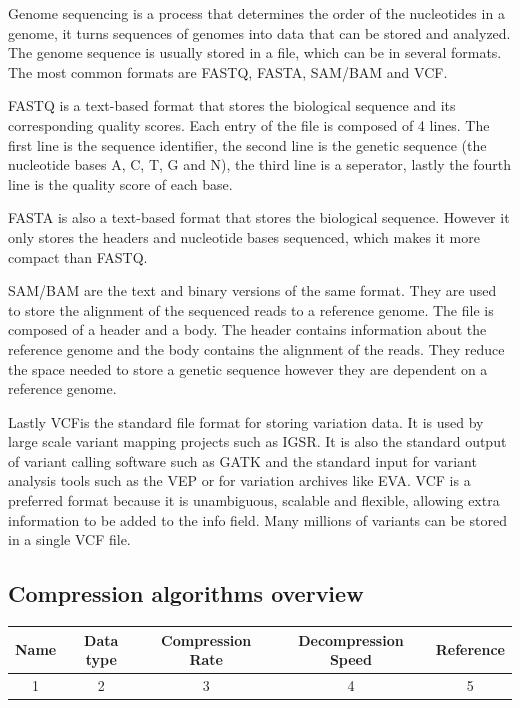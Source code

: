 Genome sequencing is a process that determines the order of the nucleotides in a genome, it turns sequences of genomes into data that can be stored and analyzed. The genome sequence is usually stored in a file, which can be in several formats. The most common formats are FASTQ, FASTA, SAM/BAM and VCF.

FASTQ is a text-based format that stores the biological sequence and its corresponding quality scores. Each entry of the file is composed of 4 lines. The first line is the sequence identifier, the second line is the genetic sequence (the nucleotide bases A, C, T, G and N), the third line is a seperator, lastly the fourth line is the quality score of each base.

FASTA is also a text-based format that stores the biological sequence. However it only stores the headers and nucleotide bases sequenced, which makes it more compact than FASTQ.

SAM/BAM are the text and binary versions of the same format. They are used to store the alignment of the sequenced reads to a reference genome. The file is composed of a header and a body. The header contains information about the reference genome and the body contains the alignment of the reads. They reduce the space needed to store a genetic sequence however they are dependent on a reference genome.

Lastly VCFis the standard file format for storing variation data. It is used by large scale variant mapping projects such as IGSR. It is also the standard output of variant calling software such as GATK and the standard input for variant analysis tools such as the VEP or for variation archives like EVA.
VCF is a preferred format because it is unambiguous, scalable and flexible, allowing extra information to be added to the info field. Many millions of variants can be stored in a single VCF file. 


\subsection{Compression algorithms overview}






\begin{center}
    \begin{tabular}{|| c | c | c | c | c ||}
        \hline
        Name & Data type & Compression Rate & Decompression Speed & Reference \\
        \hline\hline
        1 & 2 & 3 & 4 & 5\\
        \hline
    \end{tabular}
\end{center}









